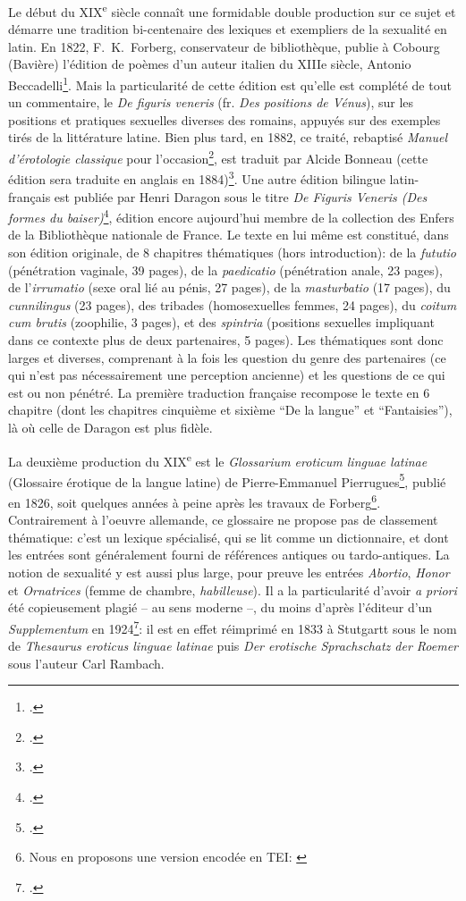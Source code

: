 Le début du XIX\textsuperscript{e} siècle connaît une formidable double production sur ce sujet et démarre une tradition bi-centenaire des lexiques et exempliers de la sexualité en latin. En 1822, F.~K.~Forberg, conservateur de bibliothèque, publie à Cobourg (Bavière) l'édition de poèmes d'un auteur italien du XIIIe siècle, Antonio Beccadelli\footcite{beccadelli_antonii_1824}. Mais la particularité de cette édition est qu'elle est complété de tout un commentaire, le \textit{De figuris veneris} (fr. \textit{Des positions de Vénus}), sur les positions et pratiques sexuelles diverses des romains, appuyés sur des exemples tirés de la littérature latine. Bien plus tard, en 1882, ce traité, rebaptisé \textit{Manuel d'érotologie classique} pour l'occasion\footcite{forberg_manuel_1882}, est traduit par Alcide Bonneau (cette édition sera traduite en anglais en 1884)\footcite{parra1997figuris}. Une autre édition bilingue latin-français est publiée par Henri Daragon sous le titre \textit{De Figuris Veneris (Des formes du baiser)}\footcite{forberg_f_1907}, édition encore aujourd'hui membre de la collection des Enfers de la Bibliothèque nationale de France. Le texte en lui même est constitué, dans son édition originale, de 8 chapitres thématiques (hors introduction): de la \textit{fututio} (pénétration vaginale, 39 pages), de la \textit{paedicatio} (pénétration anale, 23 pages), de l'\textit{irrumatio} (sexe oral lié au pénis, 27 pages), de la \textit{masturbatio} (17 pages), du \textit{cunnilingus} (23 pages), des tribades (homosexuelles femmes, 24 pages), du \textit{coitum cum brutis} (zoophilie, 3 pages), et des \textit{spintria} (positions sexuelles impliquant dans ce contexte plus de deux partenaires, 5 pages). Les thématiques sont donc larges et diverses, comprenant à la fois les question du genre des partenaires (ce qui n'est pas nécessairement une perception ancienne) et les questions de ce qui est ou non pénétré. La première traduction française recompose le texte en 6 chapitre (dont les chapitres cinquième et sixième \enquote{De la langue} et \enquote{Fantaisies}), là où celle de Daragon est plus fidèle.

La deuxième production du XIX\textsuperscript{e} est le \textit{Glossarium eroticum linguae latinae} (Glossaire érotique de la langue latine) de Pierre-Emmanuel Pierrugues\footcite{pierrugues_glossarium_1826}, publié en 1826, soit quelques années à peine après les travaux de Forberg\footnote{Nous en proposons une version encodée en TEI: \textcite{Clerice_Lasciva_Roma_Lexical_2022}}. Contrairement à l'oeuvre allemande, ce glossaire ne propose pas de classement thématique: c'est un lexique spécialisé, qui se lit comme un dictionnaire, et dont les entrées sont généralement fourni de références antiques ou tardo-antiques. La notion de sexualité y est aussi plus large, pour preuve les entrées \textit{Abortio}, \textit{Honor} et \textit{Ornatrices} (femme de chambre, \textit{habilleuse}). Il a la particularité d'avoir \textit{a priori} été copieusement plagié -- au sens moderne --, du moins d'après l'éditeur d'un \textit{Supplementum} en 1924\footcite{pierrugues_supplementum_1911}: il est en effet réimprimé en 1833 à Stutgartt sous le nom de \textit{Thesaurus eroticus linguae latinae} puis \textit{Der erotische Sprachschatz der Roemer} sous l'auteur Carl Rambach. 

